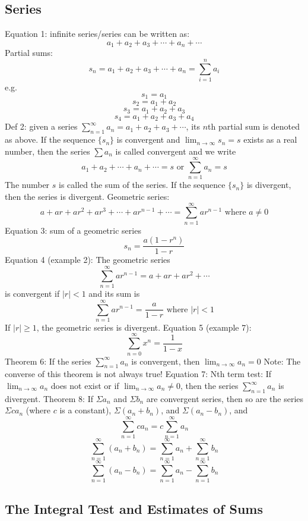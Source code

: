 \documentclass{article}
\begin{document}
    \subsection{Series}
    \begin{outline}
        \1 Equation 1: infinite series/series can be written as: \[a_1+a_2+a_3+\cdots+a_n+\cdots\]
        \1 Partial sums: \[s_n=a_1+a_2+a_3+\cdots+a_n=\sum^n_{i=1}a_i\] e.g. \[s_1=a_1\]\[s_2=a_1+a_2\]\[s_3=a_1+a_2+a_3\]\[s_4=a_1+a_2+a_3+a_4\]
        \1 Def 2: given a series \(\sum^\infty_{n=1}a_n=a_1+a_2+a_3+\cdots\), its $n$th partial sum is denoted as above.
            \2 If the sequence \(\{s_n\}\) is convergent and \(\lim_{n\to\infty}s_n=s\) exists as a real number, then the series \(\sum a_n\) is called convergent and we write \[a_1+a_2+\cdots+a_n+\cdots=s\mbox{ or }\sum^\infty_{n=1}a_n=s\]
            \2 The number $s$ is called the sum of the series. If the sequence \(\{s_n\}\) is divergent, then the series is divergent. 
        \1 Geometric series: \[a+ar+ar^2+ar^3+\cdots+ar^{n-1}+\cdots=\sum^\infty_{n=1}ar^{n-1}\mbox{ where }a\neq0\]
        \1 Equation 3: sum of a geometric series \[s_n=\dfrac{a\left(1-r^n\right)}{1-r}\]
        \1 Equation 4 (example 2): The geometric series \[\sum^\infty_{n=1}ar^{n-1}=a+ar+ar^2+\cdots\] is convergent if \(|r|<1\) and its sum is \[\sum^\infty_{n=1}ar^{n-1}=\dfrac{a}{1-r}\mbox{ where }|r|<1\] If \(|r|\geq1\), the geometric series is divergent. 
        \1 Equation 5 (example 7): \[\sum^\infty_{n=0}x^n=\dfrac{1}{1-x}\]
        \1 Theorem 6: If the series \(\sum^\infty_{n=1}a_n\) is convergent, then \(\lim_{n\to\infty}a_n=0\)
            \2 Note: The converse of this theorem is not always true!
        \1 Equation 7: Nth term test: If \(\lim_{n\to\infty}a_n\) does not exist or if \(\lim_{n\to\infty}a_n\neq0\), then the series \(\sum_{n=1}^\infty a_n\) is divergent. 
        \1 Theorem 8: If \(\Sigma a_n\) and \(\Sigma b_n\) are convergent series, then so are the series \(\Sigma ca_n\) (where $c$ is a constant), \(\Sigma\left(a_n+b_n\right)\), and \(\Sigma\left(a_n-b_n\right)\), and \[\sum^\infty_{n=1}ca_n=c\sum^\infty_{n=1}a_n\]\[\sum^\infty_{n=1}\left(a_n+b_n\right)=\sum^\infty_{n=1}a_n+\sum^\infty_{n=1}b_n\]\[\sum^\infty_{n=1}\left(a_n-b_n\right)=\sum^\infty_{n=1}a_n-\sum^\infty_{n=1}b_n\]
        
    \end{outline}
    \subsection{The Integral Test and Estimates of Sums}
    \begin{outline}
        
    \end{outline}
\end{document}
